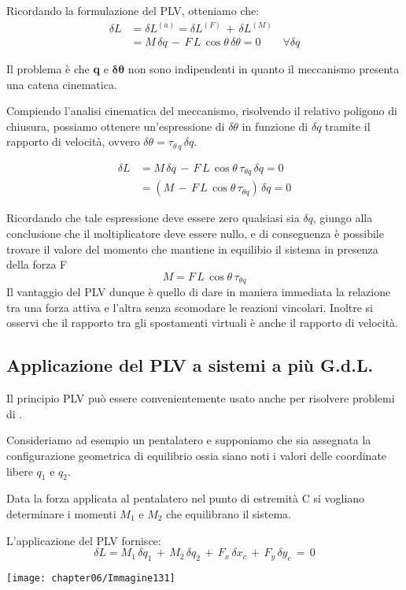 Ricordando la formulazione del PLV, otteniamo che:
\begin{align*}
\delta L &= \delta L^{(a)} = \delta L^{(F)}\,+\,\delta L^{(M)}\\
&= M\,\delta q\,-\,F\,L\,\cos{\theta}\,\delta \theta = 0\qquad\forall \delta q
\end{align*}

Il problema è che \textbf{q} e $\mathbf{\delta \theta}$ non sono indipendenti in quanto il meccanismo presenta una catena cinematica.

Compiendo l'analisi cinematica del meccanismo, risolvendo il relativo poligono di chiusura, possiamo ottenere un'espressione di $\delta \theta$ in funzione di $\delta q$ tramite il rapporto di velocità, ovvero $\delta \theta = \tau_{\theta\,q}\,\delta q$.

\begin{align*}
\delta L &= M\,\delta q\,-\,F\,L\,\cos{\theta}\,\tau_{\theta q}\,\delta q = 0\\
&= (M\,-\,F\,L\,\cos{\theta}\,\tau_{\theta q})\,\delta q = 0
\end{align*}

Ricordando che tale espressione deve essere zero qualsiasi sia $\delta q$, giungo alla conclusione che il moltiplicatore deve essere nullo, e di conseguenza è possibile trovare il valore del momento che mantiene in equilibio il sistema in presenza della forza F
\[M = F\,L\,\cos{\theta}\,\tau_{\theta q}\]
Il vantaggio del PLV dunque è quello di dare in maniera immediata la relazione tra una forza attiva e l'altra senza scomodare le reazioni vincolari. Inoltre si osservi che il rapporto tra gli spostamenti virtuali è anche il rapporto di velocità.

\subsection{Applicazione del PLV a sistemi a più G.d.L.}

		Il principio PLV può essere convenientemente  usato anche per risolvere problemi di .
		
		\begin{minipage}{.5\textwidth}
		Consideriamo ad esempio un pentalatero e supponiamo che sia assegnata la configurazione geometrica di equilibrio ossia siano noti i valori delle coordinate libere $q_1$ e $q_2$.
		
		Data la forza applicata al pentalatero nel punto di estremità C si vogliano determinare i momenti $M_1$ e $M_2$ che equilibrano il sistema.
		
		L'applicazione del PLV fornisce:
		\[\delta L = M_1\,\delta q_1\,+\,M_2\,\delta q_2\,+\,F_x\,\delta x_c\,+\,F_y\,\delta y_c\,=\,0\]
		\end{minipage}
		\hfill
		\begin{minipage}{.5\textwidth}
		\centering
		\texttt{[image: chapter06/Immagine131]}
		\end{minipage}
		
